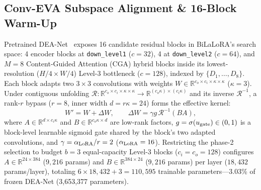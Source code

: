\documentclass[10pt,twocolumn,letterpaper]{article}
\begin{document}
\subsection{Conv-EVA Subspace Alignment \& 16-Block Warm-Up}
Pretrained DEA-Net~\cite{dea2024} exposes 16 candidate residual blocks in BiLaLoRA's search space: 4 encoder blocks at \texttt{down\_level1} ($c=32$), 4 at \texttt{down\_level2} ($c=64$), and $M=8$ Content-Guided Attention (CGA) hybrid blocks inside its lowest-resolution ($H/4\times W/4$) Level-3 bottleneck ($c=128$), indexed by $\{D_1,\ldots,D_8\}$. Each block adapts two $3\times 3$ convolutions with weights $W\in\mathbb{R}^{c_o\times c_i\times\kappa\times\kappa}$ ($\kappa=3$). Under contiguous unfolding $\mathcal{R}:\mathbb{R}^{c_o\times c_i\times\kappa\times\kappa}\to\mathbb{R}^{(c_o\kappa)\times(c_i\kappa)}$ and its inverse $\mathcal{R}^{-1}$, a rank-$r$ bypass ($r=8$, inner width $d=r\kappa=24$) forms the effective kernel:
\begin{equation}
W'=W+\Delta W,\qquad \Delta W=\gamma g\,\mathcal{R}^{-1}(BA),
\label{eq:lora}
\end{equation}
where $A\in\mathbb{R}^{d\times c_i\kappa}$ and $B\in\mathbb{R}^{c_o\kappa\times d}$ are low-rank factors, $g=\sigma(u_{\rm gate})\in(0,1)$ is a block-level learnable sigmoid gate shared by the block's two adapted convolutions, and $\gamma=\alpha_{\rm LoRA}/r=2$ ($\alpha_{\rm LoRA}=16$). Restricting the phase-2 selection to budget $b=3$ equal-capacity Level-3 blocks ($c_i=c_o=128$) configures $A\in\mathbb{R}^{24\times 384}$ ($9{,}216$ params) and $B\in\mathbb{R}^{384\times 24}$ ($9{,}216$ params) per layer ($18{,}432$ params/layer), totaling $6\times 18{,}432+3=110{,}595$ trainable parameters---3.03\% of frozen DEA-Net (3,653,377 parameters).
\end{document}
